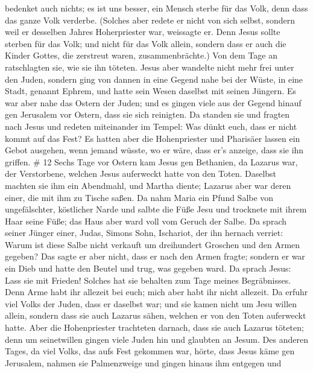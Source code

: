 bedenket auch nichts; es ist uns besser, ein Mensch sterbe für das Volk,
denn dass das ganze Volk verderbe.  (Solches aber redete er
nicht von sich selbst, sondern weil er desselben Jahres Hoherpriester
war, weissagte er. Denn Jesus sollte sterben für das Volk; 
und nicht für das Volk allein, sondern dass er auch die Kinder Gottes,
die zerstreut waren, zusammenbrächte.)  Von dem Tage an
ratschlagten sie, wie sie ihn töteten.  Jesus aber wandelte
nicht mehr frei unter den Juden, sondern ging von dannen in eine Gegend
nahe bei der Wüste, in eine Stadt, genannt Ephrem, und hatte sein Wesen
daselbst mit seinen Jüngern.  Es war aber nahe das Ostern
der Juden; und es gingen viele aus der Gegend hinauf gen Jerusalem vor
Ostern, dass sie sich reinigten.  Da standen sie und
fragten nach Jesus und redeten miteinander im Tempel: Was dünkt euch,
dass er nicht kommt auf das Fest?  Es hatten aber die
Hohenpriester und Pharisäer lassen ein Gebot ausgehen, wenn jemand
wüsste, wo er wäre, dass er's anzeige, dass sie ihn griffen. \# 12
 Sechs Tage vor Ostern kam Jesus gen Bethanien, da Lazarus
war, der Verstorbene, welchen Jesus auferweckt hatte von den Toten.
 Daselbst machten sie ihm ein Abendmahl, und Martha diente;
Lazarus aber war deren einer, die mit ihm zu Tische saßen. 
Da nahm Maria ein Pfund Salbe von ungefälschter, köstlicher Narde und
salbte die Füße Jesu und trocknete mit ihrem Haar seine Füße; das Haus
aber ward voll vom Geruch der Salbe.  Da sprach seiner
Jünger einer, Judas, Simons Sohn, Ischariot, der ihn hernach verriet:
 Warum ist diese Salbe nicht verkauft um dreihundert
Groschen und den Armen gegeben?  Das sagte er aber nicht,
dass er nach den Armen fragte; sondern er war ein Dieb und hatte den
Beutel und trug, was gegeben ward.  Da sprach Jesus: Lass
sie mit Frieden! Solches hat sie behalten zum Tage meines Begräbnisses.
 Denn Arme habt ihr allezeit bei euch; mich aber habt ihr
nicht allezeit.  Da erfuhr viel Volks der Juden, dass er
daselbst war; und sie kamen nicht um Jesu willen allein, sondern dass
sie auch Lazarus sähen, welchen er von den Toten auferweckt hatte.
 Aber die Hohenpriester trachteten darnach, dass sie auch
Lazarus töteten;  denn um seinetwillen gingen viele Juden
hin und glaubten an Jesum.  Des anderen Tages, da viel
Volks, das aufs Fest gekommen war, hörte, dass Jesus käme gen Jerusalem,
 nahmen sie Palmenzweige und gingen hinaus ihm entgegen und
